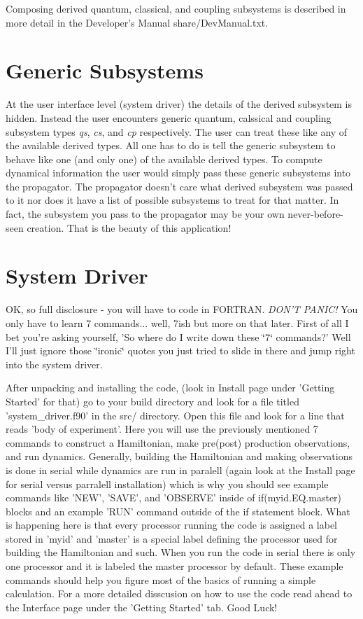 Composing derived quantum, classical, and coupling subsystems is described in more detail in the Developer's Manual share/\-Dev\-Manual.\-txt.\hypertarget{_overview_Generic_Subsystems}{}\section{Generic Subsystems}\label{_overview_Generic_Subsystems}
At the user interface level (system driver) the details of the derived subsystem is hidden. Instead the user encounters generic quantum, calssical and coupling subsystem types {\itshape qs}, {\itshape cs}, and {\itshape cp} respectively. The user can treat these like any of the available derived types. All one has to do is tell the generic subsystem to behave like one (and only one) of the available derived types. To compute dynamical information the user would simply pass these generic subsystems into the propagator. The propagator doesn't care what derived subsystem was passed to it nor does it have a list of possible subsystems to treat for that matter. In fact, the subsystem you pass to the propagator may be your own never-\/before-\/seen creation. That is the beauty of this application!\hypertarget{_overview_System_Driver}{}\section{System Driver}\label{_overview_System_Driver}
O\-K, so full disclosure -\/ you will have to code in F\-O\-R\-T\-R\-A\-N. {\itshape D\-O\-N'T} {\itshape P\-A\-N\-I\-C!} You only have to learn 7 commands... well, 7ish but more on that later. First of all I bet you're asking yourself, 'So where do I write down these \char`\"{}7\char`\"{} commands?' Well I'll just ignore those \char`\"{}ironic\char`\"{} quotes you just tried to slide in there and jump right into the system driver.

After unpacking and installing the code, (look in Install page under 'Getting Started' for that) go to your build directory and look for a file titled 'system\-\_\-driver.\-f90' in the src/ directory. Open this file and look for a line that reads 'body of experiment'. Here you will use the previously mentioned 7 commands to construct a Hamiltonian, make pre(post) production observations, and run dynamics. Generally, building the Hamiltonian and making observations is done in serial while dynamics are run in paralell (again look at the Install page for serial versus parralell installation) which is why you should see example commands like 'N\-E\-W', 'S\-A\-V\-E', and 'O\-B\-S\-E\-R\-V\-E' inside of if(myid.\-E\-Q.\-master) blocks and an example 'R\-U\-N' command outside of the if statement block. What is happening here is that every processor running the code is assigned a label stored in 'myid' and 'master' is a special label defining the processor used for building the Hamiltonian and such. When you run the code in serial there is only one processor and it is labeled the master processor by default. These example commands should help you figure most of the basics of running a simple calculation. For a more detailed disscusion on how to use the code read ahead to the Interface page under the 'Getting Started' tab. Good Luck! 